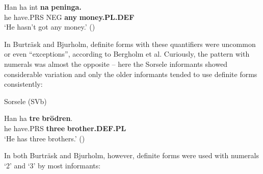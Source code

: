 \z

\item 


 \ea\label{}
\gll Han  ha  int  \textbf{na} \textbf{peninga.}\\


he  have.PRS  NEG  \textbf{any} \textbf{money.PL.DEF}\\

\glt ‘He hasn’t got any money.’ (\citet[24]{BergholmEtAl1999})

\z

In Burträsk and Bjurholm, definite forms with these quantifiers were uncommon or even “exceptions”, according to Bergholm et al. Curiously, the pattern with numerals was almost the opposite – here the Sorsele informants showed considerable variation and only the older informants tended to use definite forms consistently:


\item 

Sorsele (SVb) 



 \ea\label{}
\gll Han  ha  \textbf{tre} \textbf{brödr}\textbf{en}.\\


he  have.PRS  \textbf{three} \textbf{brother.DEF.PL}\\

\glt ‘He has three brothers.’ (\citet[24]{BergholmEtAl1999})

\z

In both Burträsk and Bjurholm, however, definite forms were used with numerals ‘2’ and ‘3’ by most informants:


\item 

